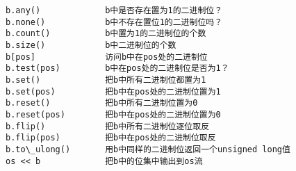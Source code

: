 \begin{lstlisting}
b.any()			  	b中是否存在置为1的二进制位？ 
b.none()		  	b中不存在置位1的二进制位吗？ 
b.count()		  	b中置为1的二进制位的个数 
b.size()		  	b中二进制位的个数 
b[pos]			  	访问b中在pos处的二进制位 
b.test(pos)		  	b中在pos处的二进制位是否为1？ 
b.set()			  	把b中所有二进制位都置为1 
b.set(pos)		  	把b中在pos处的二进制位置为1 
b.reset()		  	把b中所有二进制位置为0 
b.reset(pos)	  	把b中在pos处的二进制位置为0 
b.flip()		  	把b中所有二进制位逐位取反 
b.flip(pos)		  	把b中在pos处的二进制位取反 
b.to\_ulong()	  	用b中同样的二进制位返回一个unsigned long值 
os << b			  	把b中的位集中输出到os流
\end{lstlisting}
